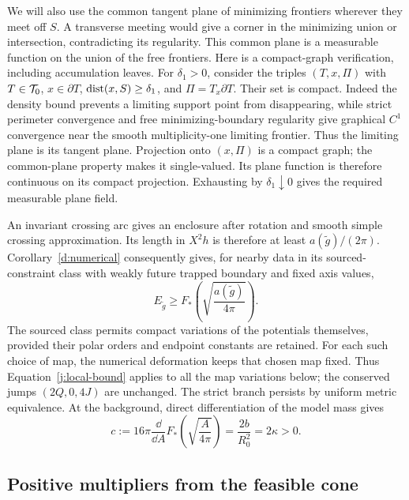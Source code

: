 We will also use the common tangent plane of minimizing frontiers wherever
they meet off \(S\). A transverse meeting would give a corner in the
minimizing union or intersection, contradicting its regularity. This
common plane is a measurable function on the union of the free frontiers.
Here is a compact-graph verification, including accumulation leaves.
For \(\delta_1>0\), consider the triples \((T,x,\Pi)\) with
\(T\in\mathcal T_0\), \(x\in\partial T\),
\(\operatorname{dist}(x,S)\geq\delta_1\), and \(\Pi=T_x\partial T\).
Their set is compact. Indeed the density bound prevents a limiting support
point from disappearing, while strict perimeter convergence and free
minimizing-boundary regularity give graphical \(C^1\) convergence near
the smooth multiplicity-one limiting frontier. Thus the limiting plane
is its tangent plane. Projection onto \((x,\Pi)\) is a compact graph;
the common-plane property makes it single-valued. Its plane function is
therefore continuous on its compact projection. Exhausting by
\(\delta_1\downarrow0\) gives the required measurable plane field.

An invariant crossing arc gives an enclosure after rotation and smooth
simple crossing approximation. Its length in \(X^2h\) is therefore at
least \(a(\widetilde g)/(2\pi)\). Corollary~\ref{d:numerical} consequently
gives, for nearby data in its sourced-constraint class with weakly future
trapped boundary and fixed axis values,
\begin{equation}
\label{j:local-bound}
 E_{\widetilde g}\geq
 F_*\left(\sqrt{\frac{a(\widetilde g)}{4\pi}}\right).
\end{equation}
The sourced class permits compact variations of the potentials themselves,
provided their polar orders and endpoint constants are retained. For each
such choice of map, the numerical deformation keeps that chosen map fixed.
Thus Equation~\eqref{j:local-bound} applies to all the map variations below;
the conserved jumps \((2Q,0,4J)\) are unchanged. The strict branch
persists by uniform metric equivalence. At the
background, direct differentiation of the model mass gives
\begin{equation}
\label{j:area-coefficient}
 c:=16\pi\frac{\dd}{\dd A}
           F_*\left(\sqrt{\frac{A}{4\pi}}\right)
   =\frac{2b}{R_0^2}=2\kappa>0.
\end{equation}

\subsection{Positive multipliers from the feasible cone}

